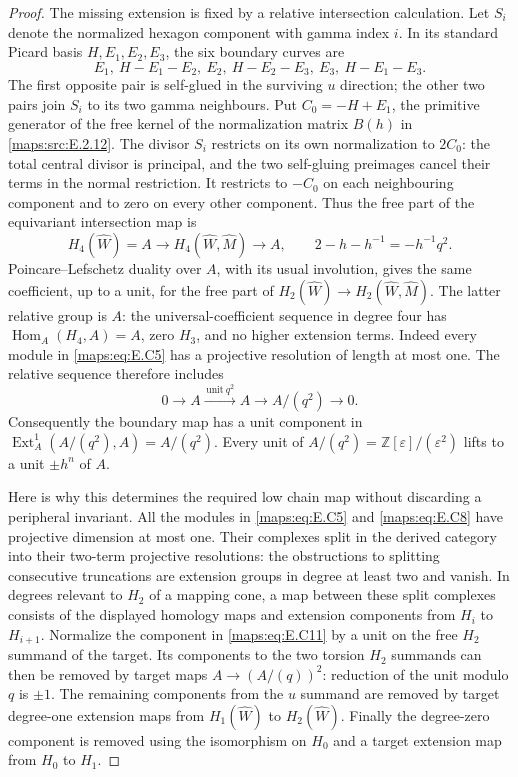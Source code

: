 \begin{proof}
The missing extension is fixed by a relative intersection
calculation. Let $S_i$ denote the normalized hexagon
component with gamma index $i$. In its standard Picard
basis $H,E_1,E_2,E_3$, the six boundary curves are
\[
 E_1,\ H-E_1-E_2,\ E_2,\ H-E_2-E_3,
                       \ E_3,\ H-E_1-E_3.
 \tag{E.C9}\label{maps:eq:E.C9}
\]
The first opposite pair is self-glued in the surviving
$u$ direction; the other two pairs join $S_i$ to its
two gamma neighbours. Put $C_0=-H+E_1$, the primitive
generator of the free kernel of the normalization matrix
$B(h)$ in \ref{maps:src:E.2.12}. The divisor $S_i$ restricts on its
own normalization to $2C_0$: the total central divisor
is principal, and the two self-gluing preimages cancel
their terms in the normal restriction. It restricts
to $-C_0$ on each neighbouring component and to zero
on every other component. Thus the free part of the
equivariant intersection map is
\[
 H_4(\widehat W)=A\longrightarrow
 H_4(\widehat W,\widehat M)\longrightarrow A,
 \qquad 2-h-h^{-1}=-h^{-1}q^2.
 \tag{E.C10}\label{maps:eq:E.C10}
\]
Poincare--Lefschetz duality over $A$, with its usual
involution, gives the same coefficient, up to a unit,
for the free part of $H_2(\widehat W)\to
H_2(\widehat W,\widehat M)$. The latter relative group
is $A$: the universal-coefficient sequence in degree
four has $\operatorname{Hom}_A(H_4,A)=A$, zero $H_3$,
and no higher extension terms. Indeed every module
in \eqref{maps:eq:E.C5} has a projective resolution of length at
most one. The relative sequence therefore includes
\[
 0\longrightarrow A\xrightarrow{\,\text{unit}\ q^2\,}A
  \longrightarrow A/(q^2)\longrightarrow0.
 \tag{E.C11}\label{maps:eq:E.C11}
\]
Consequently the boundary map has a unit component in
$\operatorname{Ext}^1_A(A/(q^2),A)=A/(q^2)$.
Every unit of $A/(q^2)=\mathbb Z[\varepsilon]/(\varepsilon^2)$
lifts to a unit $\pm h^n$ of $A$.

Here is why this determines the required low chain map
without discarding a peripheral invariant. All the
modules in \eqref{maps:eq:E.C5} and \eqref{maps:eq:E.C8} have projective dimension
at most one. Their complexes split in the derived
category into their two-term projective resolutions:
the obstructions to splitting consecutive truncations
are extension groups in degree at least two and vanish.
In degrees relevant to $H_2$ of a mapping cone, a map
between these split complexes consists of the displayed
homology maps and extension components from $H_i$ to
$H_{i+1}$. Normalize the component in \eqref{maps:eq:E.C11} by a unit
on the free $H_2$ summand of the target. Its components
to the two torsion $H_2$ summands can then be removed
by target maps $A\to(A/(q))^2$: reduction of the unit
modulo $q$ is $\pm1$. The remaining components from
the $u$ summand are removed by target degree-one
extension maps from $H_1(\widehat W)$ to
$H_2(\widehat W)$. Finally the degree-zero component
is removed using the isomorphism on $H_0$ and a target
extension map from $H_0$ to $H_1$.


\end{proof}
